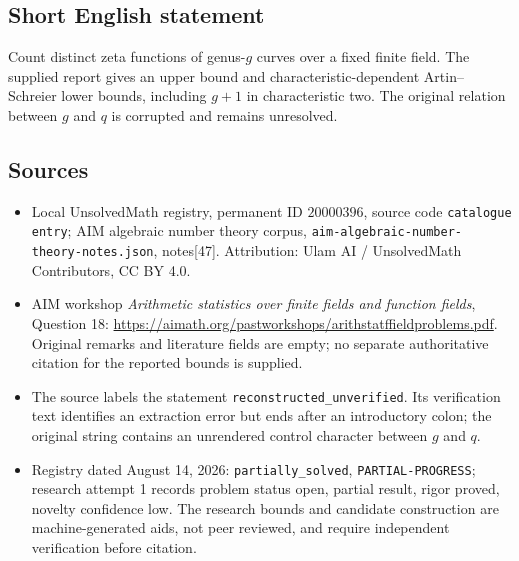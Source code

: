 \documentclass[11pt]{article}
\begin{document}
\subsection{Short English statement}
Count distinct zeta functions of genus-\(g\) curves over a fixed finite field. The supplied report gives an upper bound and characteristic-dependent Artin--Schreier lower bounds, including \(g+1\) in characteristic two. The original relation between \(g\) and \(q\) is corrupted and remains unresolved.
\subsection{Sources}
\begin{itemize}
\item Local UnsolvedMath registry, permanent ID \(20000396\), source code \texttt{catalogue entry}; AIM algebraic number theory corpus, \texttt{aim-algebraic-number-theory-notes.json}, notes[47]. Attribution: Ulam AI / UnsolvedMath Contributors, CC BY 4.0.
\item AIM workshop \emph{Arithmetic statistics over finite fields and function fields}, Question 18: \url{https://aimath.org/pastworkshops/arithstatffieldproblems.pdf}. Original remarks and literature fields are empty; no separate authoritative citation for the reported bounds is supplied.
\item The source labels the statement \texttt{reconstructed\_unverified}. Its verification text identifies an extraction error but ends after an introductory colon; the original string contains an unrendered control character between \(g\) and \(q\).
\item Registry dated August 14, 2026: \texttt{partially\_solved}, \texttt{PARTIAL-PROGRESS}; research attempt 1 records problem status open, partial result, rigor proved, novelty confidence low. The research bounds and candidate construction are machine-generated aids, not peer reviewed, and require independent verification before citation.
\end{itemize}
\end{document}

